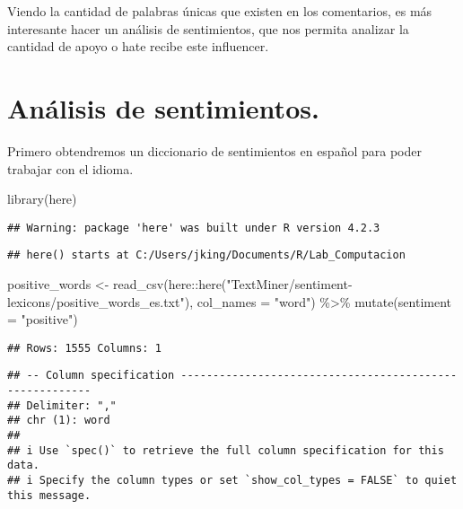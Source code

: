 \documentclass[
]{article}
\newenvironment{Shaded}{\begin{snugshade}}{\end{snugshade}}
\newcommand{\AttributeTok}[1]{\textcolor[rgb]{0.77,0.63,0.00}{#1}}
\newcommand{\FunctionTok}[1]{\textcolor[rgb]{0.00,0.00,0.00}{#1}}
\newcommand{\NormalTok}[1]{#1}
\newcommand{\OtherTok}[1]{\textcolor[rgb]{0.56,0.35,0.01}{#1}}
\newcommand{\SpecialCharTok}[1]{\textcolor[rgb]{0.00,0.00,0.00}{#1}}
\newcommand{\StringTok}[1]{\textcolor[rgb]{0.31,0.60,0.02}{#1}}
\begin{document}
Viendo la cantidad de palabras únicas que existen en los comentarios, es
más interesante hacer un análisis de sentimientos, que nos permita
analizar la cantidad de apoyo o hate recibe este influencer.

\hypertarget{anuxe1lisis-de-sentimientos.}{%
\section{Análisis de sentimientos.}\label{anuxe1lisis-de-sentimientos.}}

Primero obtendremos un diccionario de sentimientos en español para poder
trabajar con el idioma.

\begin{Shaded}
\begin{Highlighting}[]
\FunctionTok{library}\NormalTok{(here)}
\end{Highlighting}
\end{Shaded}

\begin{verbatim}
## Warning: package 'here' was built under R version 4.2.3
\end{verbatim}

\begin{verbatim}
## here() starts at C:/Users/jking/Documents/R/Lab_Computacion
\end{verbatim}

\begin{Shaded}
\begin{Highlighting}[]
\NormalTok{positive\_words }\OtherTok{\textless{}{-}}
  \FunctionTok{read\_csv}\NormalTok{(here}\SpecialCharTok{::}\FunctionTok{here}\NormalTok{(}\StringTok{"TextMiner/sentiment{-}lexicons/positive\_words\_es.txt"}\NormalTok{), }\AttributeTok{col\_names =} \StringTok{"word"}\NormalTok{) }\SpecialCharTok{\%\textgreater{}\%}
  \FunctionTok{mutate}\NormalTok{(}\AttributeTok{sentiment =} \StringTok{"positive"}\NormalTok{)}
\end{Highlighting}
\end{Shaded}

\begin{verbatim}
## Rows: 1555 Columns: 1
\end{verbatim}

\begin{verbatim}
## -- Column specification --------------------------------------------------------
## Delimiter: ","
## chr (1): word
## 
## i Use `spec()` to retrieve the full column specification for this data.
## i Specify the column types or set `show_col_types = FALSE` to quiet this message.
\end{verbatim}
\end{document}
